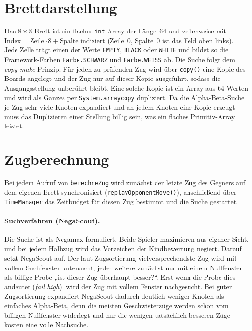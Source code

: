 \documentclass[11pt,a4paper, top=1cm]{article}
\begin{document}
\section{Brettdarstellung}
Das $8\times8$-Brett ist ein flaches \texttt{int}-Array der Länge~64 und
zeilenweise mit $\text{Index}=\text{Zeile}\cdot 8+\text{Spalte}$ indiziert
(Zeile~0, Spalte~0 ist das Feld oben links).
Jede Zelle trägt einen der Werte \texttt{EMPTY}, \texttt{BLACK} oder \texttt{WHITE} und
bildet so die Framework-Farben \texttt{Farbe.SCHWARZ} und \texttt{Farbe.WEISS} ab.
Die Suche folgt dem \textit{copy-make}-Prinzip.
Für jeden zu prüfenden Zug wird über \texttt{copy()} eine Kopie des Boards angelegt
und der Zug nur auf dieser Kopie ausgeführt, sodass die Ausgangsstellung unberührt bleibt.
Eine solche Kopie ist ein Array aus 64 Werten und wird als Ganzes per
\texttt{System.arraycopy} dupliziert.
Da die Alpha-Beta-Suche je Zug sehr viele Knoten expandiert und an jedem Knoten eine Kopie
erzeugt, muss das Duplizieren einer Stellung billig sein, was ein flaches Primitiv-Array leistet.


\section{Zugberechnung}
Bei jedem Aufruf von \texttt{berechneZug} wird zunächst der letzte Zug des Gegners auf dem
eigenen Brett synchronisiert (\texttt{replayOpponentMove()}), anschließend
über \texttt{TimeManager} das Zeitbudget für diesen Zug bestimmt und die Suche gestartet.

\paragraph{Suchverfahren (NegaScout).}
Die Suche ist als Negamax formuliert.
Beide Spieler maximieren aus eigener Sicht, und bei
jedem Halbzug wird das Vorzeichen der Kindbewertung negiert.
Darauf setzt NegaScout auf.
Der laut Zugsortierung vielversprechendste Zug wird mit vollem Suchfenster untersucht, jeder
weitere zunächst nur mit einem Nullfenster als billige Probe „ist dieser Zug überhaupt
besser?“.
Erst wenn die Probe dies andeutet (\textit{fail high}), wird der Zug mit vollem
Fenster nachgesucht.
Bei guter Zugsortierung expandiert NegaScout dadurch deutlich weniger
Knoten als einfaches Alpha-Beta, denn die meisten Geschwisterzüge werden schon vom billigen
Nullfenster widerlegt und nur die wenigen tatsächlich besseren Züge kosten eine volle
Nachsuche.
\end{document}
